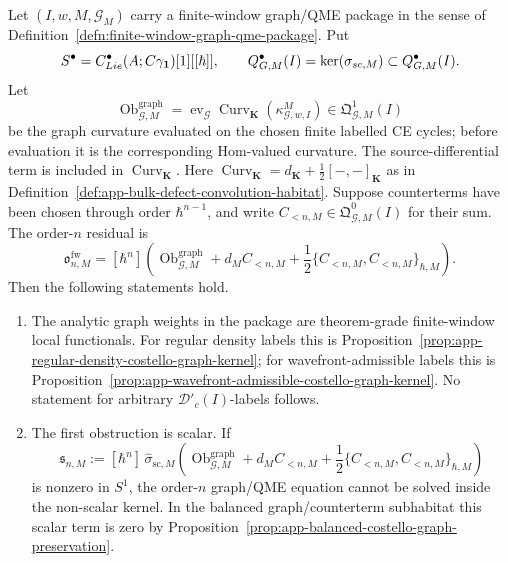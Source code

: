 \begin{thm}\label{thm:finite-window-graph-qme-assembly}
  Let
  \((I,w,M,\mathcal G_M)\) carry a finite-window graph/QME package in the
  sense of Definition~\ref{defn:finite-window-graph-qme-package}.  Put
  \[
    S^\bullet=
    C^\bullet_{Lie}(A;C\gamma_{\mathbf 1})[1][[\hbar]],
    \qquad
    Q^\bullet_{G,M}(I)
      =
    \ker(\sigma_{sc,M})
      \subset Q^\bullet_{G,M}(I).
  \]
  Let
  \[
    \operatorname{Ob}^{\mathrm{graph}}_{\mathcal G,M}
      =
    \operatorname{ev}_{\mathcal G}
    \operatorname{Curv}_{\mathbf K}(\kappa^M_{\mathcal G,w,I})
      \in \mathfrak Q^1_{\mathcal G,M}(I)
  \]
  be the graph curvature evaluated on the chosen finite labelled CE
  cycles; before evaluation it is the corresponding Hom-valued curvature.
  The source-differential term is included in
  \(\operatorname{Curv}_{\mathbf K}\).  Here
  \(\operatorname{Curv}_{\mathbf K}=d_{\mathbf K}
  +\frac12[-,-]_{\mathbf K}\) as in
  Definition~\ref{def:app-bulk-defect-convolution-habitat}.  Suppose
  counterterms have been chosen through order \(\hbar^{n-1}\), and write
  \(C_{<n,M}\in\mathfrak Q^0_{\mathcal G,M}(I)\) for their sum.  The
  order-\(n\) residual is
  \[
    \mathfrak o^{\mathrm{fw}}_{n,M}
      =
    [\hbar^n]\left(
      \operatorname{Ob}^{\mathrm{graph}}_{\mathcal G,M}
      +d_M C_{<n,M}
      +\frac12\{C_{<n,M},C_{<n,M}\}_{\hbar,M}
    \right).
  \]
  Then the following statements hold.
  \begin{enumerate}[label=(\arabic*)]
    \item The analytic graph weights in the package are theorem-grade
    finite-window local functionals.  For regular density labels this is
    Proposition~\ref{prop:app-regular-density-costello-graph-kernel}; for
    wavefront-admissible labels this is
    Proposition~\ref{prop:app-wavefront-admissible-costello-graph-kernel}.
    No statement for arbitrary \(\mathcal D'_c(I)\)-labels follows.

    \item The first obstruction is scalar.  If
    \[
      \mathfrak s_{n,M}:=
      [\hbar^n]\,
      \widehat\sigma_{\mathrm{sc},M}\!\left(
        \operatorname{Ob}^{\mathrm{graph}}_{\mathcal G,M}
        +d_M C_{<n,M}
        +\frac12\{C_{<n,M},C_{<n,M}\}_{\hbar,M}
      \right)
    \]
    is nonzero in \(S^1\), the order-\(n\) graph/QME equation cannot be
    solved inside the non-scalar kernel.  In the balanced graph/counterterm
    subhabitat this scalar term is zero by
    Proposition~\ref{prop:app-balanced-costello-graph-preservation}.


\end{enumerate}
\end{thm}

